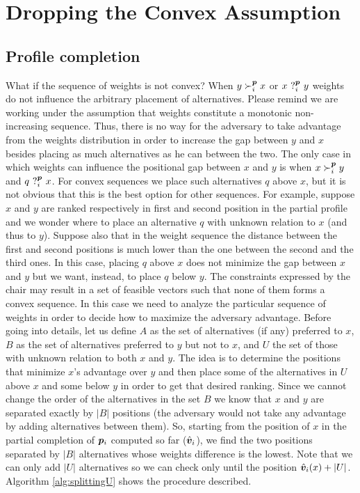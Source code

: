 \section{Dropping the Convex Assumption}
\subsection{Profile completion}
What if the sequence of weights is not convex? When $y \succ_i^{\bm{p}} x$ or $x \ ?_i^{\bm{p}} \ y$ weights do not influence the arbitrary placement of alternatives. Please remind we are working under the assumption that weights constitute a monotonic non-increasing sequence. Thus, there is no way for the adversary to take advantage from the weights distribution in order to increase the gap between $y$ and $x$ besides placing as much alternatives as he can between the two. The only case in which weights can influence the positional gap between $x$ and $y$ is when $x \succ_i^{\bm{p}} y$ and $q \ ?_i^{\bm{p}} \ x$. For convex sequences we place such alternatives $q$ above $x$, but it is not obvious that this is the best option for other sequences. For example, suppose $x$ and $y$ are ranked respectively in first and second position in the partial profile and we wonder where to place an alternative $q$ with unknown relation to $x$ (and thus to $y$). Suppose also that in the weight sequence the distance between the first and second positions is much lower than the one between the second and the third ones. In this case, placing $q$ above $x$ does not minimize the gap between $x$ and $y$ but we want, instead, to place $q$ below $y$.
\newline The constraints expressed by the chair may result in a set of feasible vectors such that none of them forms a convex sequence. In this case we need to analyze the particular sequence of weights in order to decide how to maximize the adversary advantage. Before going into details, let us define $A$ as the set of alternatives (if any) preferred to $x$, $B$ as the set of alternatives preferred to $y$ but not to $x$, and $U$ the set of those with unknown relation to both $x$ and $y$. The idea is to determine the positions that minimize $x$'s advantage over $y$ and then place some of the alternatives in $U$ above $x$ and some below $y$ in order to get that desired ranking. Since we cannot change the order of the alternatives in the set $B$ we know that $x$ and $y$ are separated exactly by $|B|$ positions (the adversary would not take any advantage by adding alternatives between them). So, starting from the position of $x$ in the partial completion of ${\bm{p}}_i$ computed so far ($\hat{\bm{v}}_i$), we find the two positions separated by $|B|$ alternatives whose weights difference is the lowest. Note that we can only add $|U|$ alternatives so we can check only until the position $\hat{\bm{v}}_i(x)+|U|$. Algorithm \ref{alg:splittingU} shows the procedure described.

